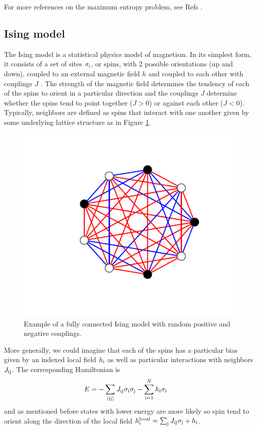 \documentclass[aps,prl,twocolumn]{revtex4-1}
\begin{document}
For more references on the maximum entropy problem, see Refs \cite{Jaynes:1957fy,Bialek:2012ueb,Lee:2015ev}.

\subsection{Ising model}
The Ising model is a statistical physics model of magnetism. In its simplest form, it consists of a set of sites $\sigma_{\rm i}$, or spins, with 2 possible orientations (up and down), coupled to an external magnetic field $h$ and coupled to each other with couplings $J$ \cite{Reif:2009uf}. The strength of the magnetic field determines the tendency of each of the spins to orient in a particular direction and the couplings $J$ determine whether the spins tend to point together ($J>0$) or against each other ($J<0$). Typically, neighbors are defined as spins that interact with one another given by some underlying lattice structure as in Figure \ref{gr:ising}.

\begin{figure}[tb]\centering
	\includegraphics[width=.85\linewidth,clip,trim={100 70 70 60}]{images/ising_example}
\caption{Example of a fully connected Ising model with random positive and negative couplings.}
\label{gr:ising}
\end{figure}

More generally, we could imagine that each of the spins has a particular bias given by an indexed local field $h_{\rm i}$ as well as particular interactions with neighbors $J_{\rm ij}$. The corresponding Hamiltonian is
\begin{align}
	E &= -\sum_{\rm \left<ij\right>} J_{\rm ij}\sigma_{\rm i}\sigma_{\rm j} -\sum_{\rm i=1}^Nh_{\rm i}\sigma_{\rm i}
\end{align}
and as mentioned before states with lower energy are more likely so spin tend to orient along the direction of the local field $h_{\rm i}^{\rm local} = \sum_{\rm j}J_{\rm ij}\sigma_{\rm j} +h_{\rm i}$. 
\end{document}
